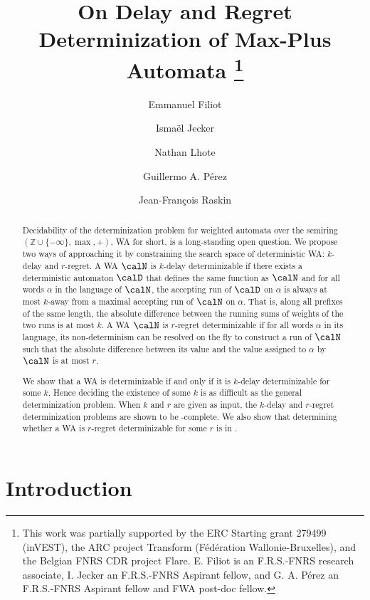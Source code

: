 \documentclass[a4paper]{article}
\title{On Delay and Regret Determinization of Max-Plus Automata
\thanks{This work was partially supported by the ERC Starting grant 279499
	(inVEST), the ARC project Transform (F\'ed\'eration Wallonie-Bruxelles),
	and the Belgian FNRS CDR project Flare. E. Filiot is an F.R.S.-FNRS
	research associate, I. Jecker an F.R.S.-FNRS Aspirant fellow, and G. A.
	P\'erez an F.R.S.-FNRS Aspirant fellow and FWA post-doc fellow.}
}
\author[1]{Emmanuel Filiot}
\author[1]{Isma\"el Jecker}
\author[1,2]{Nathan Lhote}
\author[1]{Guillermo A. P\'erez}
\author[1]{Jean-Fran\c{c}ois Raskin}
\affil[1]{Universit\'{e} Libre de Bruxelles}
\affil[2]{Universit\'e de Bordeaux, LaBRI}
\affil[ ]{\{efiliot, ijecker, gperezme, jraskin\}@ulb.ac.be, nlhote@labri.fr}
\begin{document}
\maketitle

\begin{abstract}
    Decidability of the determinization problem for weighted automata over the
    semiring $(\mathbb{Z}\cup  \{ -\infty \}, \max,+)$, WA for short, is a
    long-standing open question. We propose two ways of approaching it by
    constraining the search space of deterministic WA: $k$-delay and
    $r$-regret. A WA $\calN$ is $k$-delay determinizable if there exists a
    deterministic automaton $\calD$ that defines the same function as $\calN$
    and for all words $\alpha$ in the language of $\calN$, the
    accepting run of $\calD$ on $\alpha$ is always at most $k$-away from a
    maximal accepting run of $\calN$ on $\alpha$. That is, along all prefixes of
    the same length, the absolute difference between the running sums of weights
    of the two runs is at most $k$.
    A WA $\calN$ is $r$-regret determinizable if for all words $\alpha$ in its
    language, its non-determinism can be resolved on the fly to construct a run
    of $\calN$ such that the absolute difference between its value and the value
    assigned to $\alpha$ by $\calN$ is at most $r$.

    We show that a WA is determinizable if and only if it is $k$-delay
    determinizable for some $k$. Hence deciding the existence of some $k$ is
    as difficult as the general determinization problem. When $k$ and $r$ are
    given as input, the $k$-delay and $r$-regret determinization problems are
    shown to be \EXP-complete. We also show that determining whether a
    WA is $r$-regret determinizable for some $r$ is in \EXP.
\end{abstract}

\section{Introduction}
\end{document}
